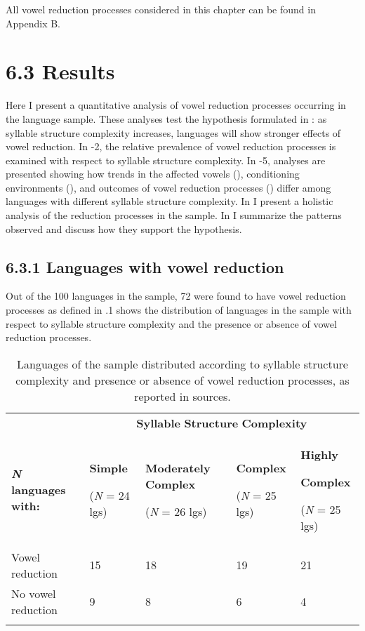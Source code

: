   All vowel reduction processes considered in this chapter can be found in Appendix B.

\section{6.3  Results}

  Here I present a quantitative analysis of vowel reduction processes occurring in the language sample. These analyses test the hypothesis formulated in : as syllable structure complexity increases, languages will show stronger effects of vowel reduction. In -2, the relative prevalence of vowel reduction processes is examined with respect to syllable structure complexity. In -5, analyses are presented showing how trends in the affected vowels (), conditioning environments (), and outcomes of vowel reduction processes () differ among languages with different syllable structure complexity. In  I present a holistic analysis of the reduction processes in the sample. In  I summarize the patterns observed and discuss how they support the hypothesis.

\subsection{6.3.1 Languages with vowel reduction}

  Out of the 100 languages in the sample, 72 were found to have vowel reduction processes as defined in  .1 shows the distribution of languages in the sample with respect to syllable structure complexity and the presence or absence of vowel reduction processes.

\begin{table}
\begin{tabularx}{\textwidth}{XXXXX}
\lsptoprule
 & \multicolumn{4}{c}{ \textbf{Syllable} \textbf{Structure} \textbf{Complexity}}\\
 \textbf{\textit{N}} \textbf{languages} \textbf{with:} & { \textbf{Simple}}

 (\textit{N} = 24 lgs) & { \textbf{Moderately} \textbf{Complex}}

 (\textit{N} = 26 lgs) & { \textbf{Complex}}

 (\textit{N} = 25 lgs) & { \textbf{Highly} }

{ \textbf{Complex}}

 (\textit{N} = 25 lgs)\\
 Vowel reduction & 15 & 18 & 19 & 21\\
 No vowel reduction & 9 & 8 & 6 & 4\\
\lspbottomrule
\end{tabularx}
\caption{\label{6.1}Languages of the sample distributed according to syllable structure complexity and presence or absence of vowel reduction processes, as reported in sources.}
\end{table}

